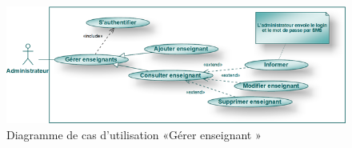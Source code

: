 \documentclass[12 pt ]{report}
\begin{document}
\begin{figure}[h]
 \begin{center}
 \includegraphics[width= 13 cm ,height= 6 cm]{admin2.png}
\caption{ Diagramme de cas d'utilisation  «Gérer enseignant »}
 \end{center}
\end{figure}

\end{document}
